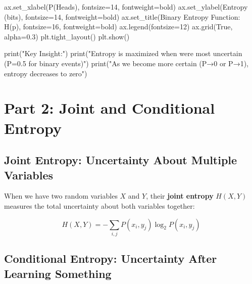 \documentclass[
  11pt,
  letterpaper,
  oneside,
  openany]{book}
\newenvironment{Shaded}{\begin{snugshade}}{\end{snugshade}}
\newcommand{\BuiltInTok}[1]{\textcolor[rgb]{0.00,0.23,0.31}{#1}}
\newcommand{\DecValTok}[1]{\textcolor[rgb]{0.68,0.00,0.00}{#1}}
\newcommand{\FloatTok}[1]{\textcolor[rgb]{0.68,0.00,0.00}{#1}}
\newcommand{\NormalTok}[1]{\textcolor[rgb]{0.00,0.23,0.31}{#1}}
\newcommand{\OperatorTok}[1]{\textcolor[rgb]{0.37,0.37,0.37}{#1}}
\newcommand{\StringTok}[1]{\textcolor[rgb]{0.13,0.47,0.30}{#1}}
\newcommand{\VariableTok}[1]{\textcolor[rgb]{0.07,0.07,0.07}{#1}}
\begin{document}
\begin{Shaded}
\begin{Highlighting}[]
\NormalTok{ax.set\_xlabel(}\StringTok{\textquotesingle{}P(Heads)\textquotesingle{}}\NormalTok{, fontsize}\OperatorTok{=}\DecValTok{14}\NormalTok{, fontweight}\OperatorTok{=}\StringTok{\textquotesingle{}bold\textquotesingle{}}\NormalTok{)}
\NormalTok{ax.set\_ylabel(}\StringTok{\textquotesingle{}Entropy (bits)\textquotesingle{}}\NormalTok{, fontsize}\OperatorTok{=}\DecValTok{14}\NormalTok{, fontweight}\OperatorTok{=}\StringTok{\textquotesingle{}bold\textquotesingle{}}\NormalTok{)}
\NormalTok{ax.set\_title(}\StringTok{\textquotesingle{}Binary Entropy Function: H(p)\textquotesingle{}}\NormalTok{, fontsize}\OperatorTok{=}\DecValTok{16}\NormalTok{, fontweight}\OperatorTok{=}\StringTok{\textquotesingle{}bold\textquotesingle{}}\NormalTok{)}
\NormalTok{ax.legend(fontsize}\OperatorTok{=}\DecValTok{12}\NormalTok{)}
\NormalTok{ax.grid(}\VariableTok{True}\NormalTok{, alpha}\OperatorTok{=}\FloatTok{0.3}\NormalTok{)}
\NormalTok{plt.tight\_layout()}
\NormalTok{plt.show()}

\BuiltInTok{print}\NormalTok{(}\StringTok{"Key Insight:"}\NormalTok{)}
\BuiltInTok{print}\NormalTok{(}\StringTok{"Entropy is maximized when we\textquotesingle{}re most uncertain (P=0.5 for binary events)"}\NormalTok{)}
\BuiltInTok{print}\NormalTok{(}\StringTok{"As we become more certain (P→0 or P→1), entropy decreases to zero"}\NormalTok{)}
\end{Highlighting}
\end{Shaded}

\section{Part 2: Joint and Conditional
Entropy}\label{part-2-joint-and-conditional-entropy}

\subsection{Joint Entropy: Uncertainty About Multiple
Variables}\label{joint-entropy-uncertainty-about-multiple-variables}

When we have two random variables \(X\) and \(Y\), their \textbf{joint
entropy} \(H(X, Y)\) measures the total uncertainty about both variables
together:

\[H(X,Y) = -\sum_{i,j} P(x_i, y_j) \log_2 P(x_i, y_j)\]

\subsection{Conditional Entropy: Uncertainty After Learning
Something}\label{conditional-entropy-uncertainty-after-learning-something}
\end{document}
